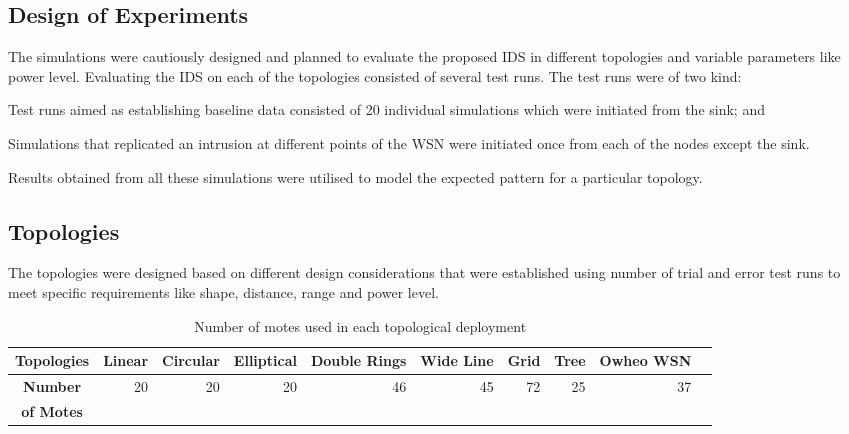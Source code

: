 \documentclass[conference,manuscript]{IEEEtran}
\newcommand*{\bd}[1]{\multicolumn{1}{|c}{\bfseries #1}}
\begin{document}
\subsection*{Design of Experiments}
\label{subsec:exp_des}

The simulations were cautiously designed and planned to evaluate the proposed IDS in different topologies and variable parameters like power level.
Evaluating the IDS on each of the topologies consisted of several test runs.
The test runs were of two kind: 
\begin{inparaenum}
\item Test runs aimed as establishing baseline data consisted of 20 individual simulations which were initiated from the sink; and
\item Simulations that replicated an intrusion at different points of the WSN were initiated once from each of the nodes except the sink.
\end{inparaenum}
Results obtained from all these simulations were utilised to model the expected pattern for a particular topology.

\subsection*{Topologies}
\label{subsec:topos}
The topologies were designed based on different design considerations that were established using number of trial and error test runs to meet specific requirements like shape, distance, range and power level. 

\begin{table}[t!]
\centering
\begin{tabular}{|l|*{8}{r|}r}
\hline
\bd{Topologies}           & \bd{Linear} & \bd{Circular} & \bd{Elliptical} & \bd{Double Rings} & \bd{Wide Line} & \bd{Grid} & \bd{Tree} & \bd{Owheo WSN}   \\
\hline
\bd{Number}           & 20 & 20 & 20 & 46 & 45 & 72 & 25 & 37   \\
 \bd{of Motes}           &  &  &  &  &  &  &  &    \\
\hline
\end{tabular}
\caption{Number of motes used in each topological deployment}
\label{tab:topos}
\end{table}
\end{document}
